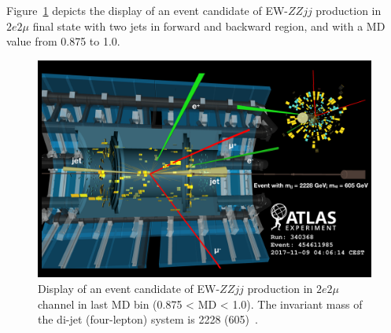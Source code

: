 Figure~\ref{fig:event_display} depicts the display of an event candidate of EW-$ZZjj$ production in $2e2\mu$ final state with two jets in forward and backward region, and with a MD value from 0.875 to 1.0.
\begin{figure}[!htbp]
\begin{center}
\includegraphics[width=1.0\textwidth]{figures/VBSZZ/fit/resize_340368_454611985_v3.pdf}
\end{center}
\caption{Display of an event candidate of EW-$ZZjj$ production in $2e2\mu$ channel in last MD bin (0.875 < MD < 1.0).
         The invariant mass of the di-jet (four-lepton) system is 2228 (605)~\gev. }
\label{fig:event_display}
\end{figure}
